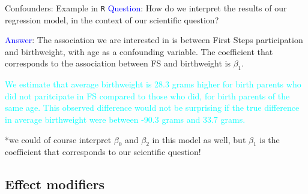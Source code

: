 \documentclass[10pt,t]{beamer}
\begin{document}
\begin{frame}{Confounders: Example in \texttt{R}}
\textcolor{blue}{Question}: How do we interpret the results of our regression model, in the context of our scientific question?

\vspace{0.3cm}

\textcolor{blue}{Answer}: The association we are interested in is between First Steps participation and birthweight, with age as a confounding variable. The coefficient that corresponds to the association between FS and birthweight is $\beta_1$.

\vspace{0.3cm}

\textcolor{cyan}{We estimate that average birthweight is 28.3 grams higher for birth parents who did not paritcipate in FS compared to those who did, for birth parents of the same age. This observed difference would not be surprising if the true difference in average birthweight were between -90.3 grams and  33.7 grams.} \pause

\vspace{0.3cm}

*we could of course interpret $\beta_0$ and $\beta_2$ in this model as well, but $\beta_1$ is the coefficient that corresponds to our scientific question!
\end{frame}

\subsection{Effect modifiers}
\end{document}
